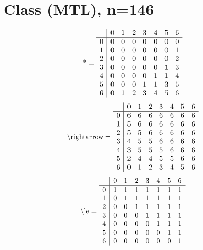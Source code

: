 \documentclass[11pt]{article}
\begin{document}
\section{Class (MTL), n=146}
\[\text{*} = 
\begin{array}{r | r r r r r r r}
 & 0 & 1 & 2 & 3 & 4 & 5 & 6 \\ \hline
0 & 0 & 0 & 0 & 0 & 0 & 0 & 0 \\
1 & 0 & 0 & 0 & 0 & 0 & 0 & 1 \\
2 & 0 & 0 & 0 & 0 & 0 & 0 & 2 \\
3 & 0 & 0 & 0 & 0 & 0 & 1 & 3 \\
4 & 0 & 0 & 0 & 0 & 1 & 1 & 4 \\
5 & 0 & 0 & 0 & 1 & 1 & 3 & 5 \\
6 & 0 & 1 & 2 & 3 & 4 & 5 & 6 \\
\end{array}
\]
\[\text{\textbackslash rightarrow} = 
\begin{array}{r | r r r r r r r}
 & 0 & 1 & 2 & 3 & 4 & 5 & 6 \\ \hline
0 & 6 & 6 & 6 & 6 & 6 & 6 & 6 \\
1 & 5 & 6 & 6 & 6 & 6 & 6 & 6 \\
2 & 5 & 5 & 6 & 6 & 6 & 6 & 6 \\
3 & 4 & 5 & 5 & 6 & 6 & 6 & 6 \\
4 & 3 & 5 & 5 & 5 & 6 & 6 & 6 \\
5 & 2 & 4 & 4 & 5 & 5 & 6 & 6 \\
6 & 0 & 1 & 2 & 3 & 4 & 5 & 6 \\
\end{array}
\]
\[\text{\textbackslash le} = 
\begin{array}{r | r r r r r r r}
 & 0 & 1 & 2 & 3 & 4 & 5 & 6 \\ \hline
0 & 1 & 1 & 1 & 1 & 1 & 1 & 1 \\
1 & 0 & 1 & 1 & 1 & 1 & 1 & 1 \\
2 & 0 & 0 & 1 & 1 & 1 & 1 & 1 \\
3 & 0 & 0 & 0 & 1 & 1 & 1 & 1 \\
4 & 0 & 0 & 0 & 0 & 1 & 1 & 1 \\
5 & 0 & 0 & 0 & 0 & 0 & 1 & 1 \\
6 & 0 & 0 & 0 & 0 & 0 & 0 & 1 \\
\end{array}
\]
\end{document}
